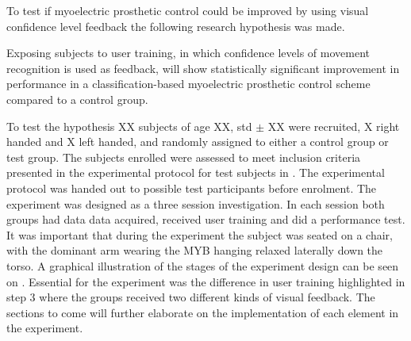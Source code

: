 To test if myoelectric prosthetic control could be improved by using visual confidence level feedback the following research hypothesis was made.  
\begin{center}
	Exposing subjects to user training, in which confidence levels of movement recognition is used as feedback, will show statistically significant improvement in performance in a classification-based myoelectric prosthetic control scheme compared to a control group.
\end{center}


To test the hypothesis XX subjects of age XX, std $\pm$ XX were recruited, X right handed and X left handed, and randomly assigned to either a control group or test group. The subjects enrolled were assessed to meet inclusion criteria presented in the experimental protocol for test subjects in . The experimental protocol was handed out to possible test participants before enrolment. The experiment was designed as a three session investigation. In each session both groups had data data acquired, received user training and did a performance test. It was important that during the experiment the subject was seated on a chair, with the dominant arm wearing the MYB hanging relaxed laterally down the torso. A graphical illustration of the stages of the experiment design can be seen on . Essential for the experiment was the difference in user training highlighted in step 3 where the groups received two different kinds of visual feedback. The sections to come will further elaborate on the implementation of each element in the experiment.
 
